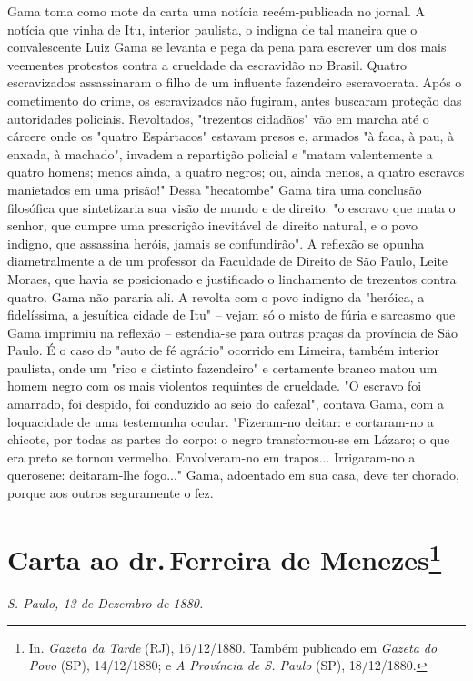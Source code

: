 {\small\noindent
Gama toma como mote da carta uma notícia recém-publicada no
jornal. A notícia que vinha de Itu, interior paulista, o indigna de tal
maneira que o convalescente Luiz Gama se levanta e pega da pena para
escrever um dos mais veementes protestos contra a crueldade da
escravidão no Brasil. Quatro escravizados assassinaram o filho de um
influente fazendeiro escravocrata. Após o cometimento do crime, os
escravizados não fugiram, antes buscaram proteção das autoridades
policiais. Revoltados, "trezentos cidadãos" vão em marcha até o cárcere
onde os "quatro Espártacos" estavam presos e, armados "à faca, à pau, à
enxada, à machado", invadem a repartição policial e "matam valentemente
a quatro homens; menos ainda, a quatro negros; ou, ainda menos, a quatro
escravos manietados em uma prisão!" Dessa "hecatombe" Gama tira uma
conclusão filosófica que sintetizaria sua visão de mundo e de direito:
"o escravo que mata o senhor, que cumpre uma prescrição inevitável de
direito natural, e o povo indigno, que assassina heróis, jamais se
confundirão". A reflexão se opunha diametralmente a de um professor da
Faculdade de Direito de São Paulo, Leite Moraes, que havia se
posicionado e justificado o linchamento de trezentos contra quatro. Gama
não pararia ali. A revolta com o povo indigno da "heróica, a
fidelíssima, a jesuítica cidade de Itu" -- vejam só o misto de fúria e
sarcasmo que Gama imprimiu na reflexão -- estendia-se para outras praças
da província de São Paulo. É o caso do "auto de fé agrário" ocorrido em
Limeira, também interior paulista, onde um "rico e distinto fazendeiro"
e certamente branco matou um homem negro com os mais violentos requintes
de crueldade. "O escravo foi amarrado, foi despido, foi conduzido ao
seio do cafezal", contava Gama, com a loquacidade de uma testemunha
ocular. "Fizeram-no deitar: e cortaram-no a chicote, por todas as partes
do corpo: o negro transformou-se em Lázaro; o que era preto se tornou
vermelho. Envolveram-no em trapos... Irrigaram-no a querosene:
deitaram-lhe fogo..." Gama, adoentado em sua casa, deve ter chorado,
porque aos outros seguramente o fez. }

\chapter{Carta ao dr.\,Ferreira de Menezes\footnote[*]{In.
  \emph{Gazeta da Tarde} (RJ), 16/12/1880. Também publicado em
  \emph{Gazeta do Povo} (SP), 14/12/1880; e \emph{A Província de S.
  Paulo} (SP), 18/12/1880.}}

\emph{S. Paulo, 13 de Dezembro de 1880. }

